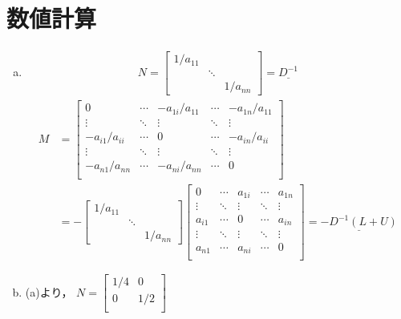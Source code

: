 \documentclass{jsarticle}
\begin{document}
\newpage
\section{数値計算}
\begin{enumerate}[(a)]
  \item
  \begin{align*}
    N = 
    \begin{bmatrix}
      1/a_{11} & & \\
      & \ddots & \\
      & & 1/a_{nn}
    \end{bmatrix}
    = \underline{D^{-1}}
  \end{align*}
  \begin{align*}
    M &=
    \begin{bmatrix}
      0 & \cdots & -a_{1i}/a_{11}  & \cdots & -a_{1n}/a_{11} \\
      \vdots & \ddots  & \vdots  & \ddots & \vdots \\
      -a_{i1}/a_{ii} & \cdots  & 0  & \cdots & -a_{in}/a_{ii} \\
      \vdots & \ddots &  \vdots & \ddots & \vdots \\
      -a_{n1}/a_{nn} & \cdots & -a_{ni}/a_{nn} & \cdots & 0 \\
    \end{bmatrix} \\
    &=-
    \begin{bmatrix}
      1/a_{11} & & \\
      & \ddots & \\
      & & 1/a_{nn}
    \end{bmatrix}
    \begin{bmatrix}
      0 & \cdots & a_{1i} & \cdots & a_{1n} \\
      \vdots & \ddots & \vdots & \ddots & \vdots \\
      a_{i1} & \cdots & 0  & \cdots & a_{in} \\
      \vdots & \ddots & \vdots & \ddots & \vdots \\
      a_{n1} & \cdots & a_{ni} & \cdots & 0 \\
    \end{bmatrix}
    = \underline{-D^{-1}(L+U)}
  \end{align*}
  \item (a)より，
  \begin{math}
    N=
    \begin{bmatrix}
      1/4 & 0 \\
      0 & 1/2 \\

\end{bmatrix}
\end{math}
\end{enumerate}
\end{document}
